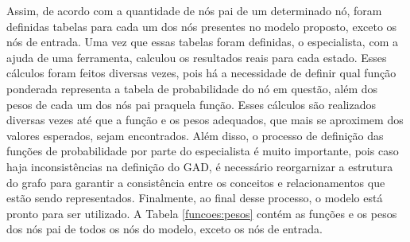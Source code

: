 \begin{table}[ht!]
\centering
\caption{Tabela para definição das Funções de Probabilidade de nós com três pais}
\label{funcoes:3nos}
\end{table}

Assim, de acordo com a quantidade de nós pai de um determinado nó, foram definidas tabelas para cada um dos nós presentes no modelo proposto, exceto os nós de entrada. Uma vez que essas tabelas foram definidas, o especialista, com a ajuda de uma ferramenta, calculou os resultados reais para cada estado. Esses cálculos foram feitos diversas vezes, pois há a necessidade de definir qual função ponderada representa a tabela de probabilidade do nó em questão, além dos pesos de cada um dos nós pai praquela função. Esses cálculos são realizados diversas vezes até que a função e os pesos adequados, que mais se aproximem dos valores esperados, sejam encontrados. Além disso, o processo de definição das funções de probabilidade por parte do especialista é muito importante, pois caso haja inconsistências na definição do GAD, é necessário reorgarnizar a estrutura do grafo para garantir a consistência entre os conceitos e relacionamentos que estão sendo representados. Finalmente, ao final desse processo, o modelo está pronto para ser utilizado. A Tabela \ref{funcoes:pesos} contém as funções e os pesos dos nós pai de todos os nós do modelo, exceto os nós de entrada.

